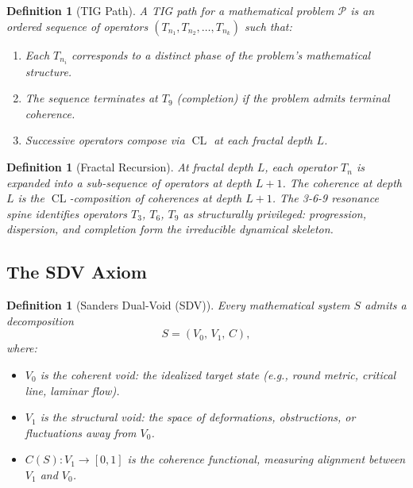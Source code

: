 \documentclass[11pt]{article}
\newtheorem{definition}[theorem]{Definition}
\DeclareMathOperator{\CL}{CL}
\begin{document}
\begin{definition}[TIG Path]
\label{def:tig-path}
A \emph{TIG path} for a mathematical problem $\mathcal{P}$ is an
ordered sequence of operators $(T_{n_1}, T_{n_2}, \ldots, T_{n_k})$
such that:
\begin{enumerate}
\item Each $T_{n_i}$ corresponds to a distinct phase of the
problem's mathematical structure.
\item The sequence terminates at $T_9$ (completion) if the problem
admits terminal coherence.
\item Successive operators compose via $\CL$ at each fractal
depth $L$.
\end{enumerate}
\end{definition}

\begin{definition}[Fractal Recursion]
\label{def:fractal}
At fractal depth $L$, each operator $T_n$ is expanded into a
sub-sequence of operators at depth $L+1$.  The coherence at depth $L$
is the $\CL$-composition of coherences at depth $L+1$.  The
\emph{3-6-9 resonance spine} identifies operators $T_3$, $T_6$, $T_9$
as structurally privileged: progression, dispersion, and completion
form the irreducible dynamical skeleton.
\end{definition}

\subsection{The SDV Axiom}
\label{subsec:sdv}

\begin{definition}[Sanders Dual-Void (SDV)]
\label{def:sdv}
Every mathematical system $S$ admits a decomposition
\[
S = (V_0,\, V_1,\, C),
\]
where:
\begin{itemize}
\item $V_0$ is the \emph{coherent void}: the idealized target state
(e.g., round metric, critical line, laminar flow).
\item $V_1$ is the \emph{structural void}: the space of deformations,
obstructions, or fluctuations away from $V_0$.
\item $C(S) : V_1 \to [0,1]$ is the \emph{coherence functional},
measuring alignment between $V_1$ and $V_0$.
\end{itemize}
\end{definition}
\end{document}
